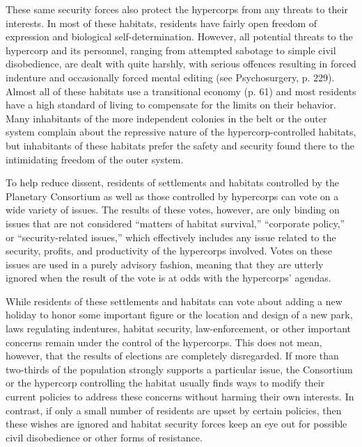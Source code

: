 These same security forces also protect the hypercorps from any
threats to their interests. In most of these habitats, residents have
fairly open freedom of expression and biological self-determination.
However, all potential threats to the hypercorp and its personnel,
ranging from attempted sabotage to simple civil disobedience, are
dealt with quite harshly, with serious offences resulting in forced
indenture and occasionally forced mental editing (see Psychosurgery,
p. 229). Almost all of these habitats use a transitional economy
(p. 61) and most residents have a high standard of living to
compensate for the limits on their behavior. Many inhabitants of the
more independent colonies in the belt or the outer system complain
about the repressive nature of the hypercorp-controlled habitats, but
inhabitants of these habitats prefer the safety and security found
there to the intimidating freedom of the outer system.

To help reduce dissent, residents of settlements and habitats
controlled by the Planetary Consortium as well as those controlled by
hypercorps can vote on a wide variety of issues. The results of these
votes, however, are only binding on issues that are not considered
“matters of habitat survival,” “corporate policy,” or
“security-related issues,” which effectively includes any issue
related to the security, profits, and productivity of the hypercorps
involved. Votes on these issues are used in a purely advisory fashion,
meaning that they are utterly ignored when the result of the vote is
at odds with the hypercorps' agendas.

While residents of these settlements and habitats can vote about
adding a new holiday to honor some important figure or the location
and design of a new park, laws regulating indentures, habitat
security, law-enforcement, or other important concerns remain under
the control of the hypercorps. This does not mean, however, that the
results of elections are completely disregarded. If more than
two-thirds of the population strongly supports a particular issue, the
Consortium or the hypercorp controlling the habitat usually finds ways
to modify their current policies to address these concerns without
harming their own interests. In contrast, if only a small number of
residents are upset by certain policies, then these wishes are ignored
and habitat security forces keep an eye out for possible civil
disobedience or other forms of resistance.

